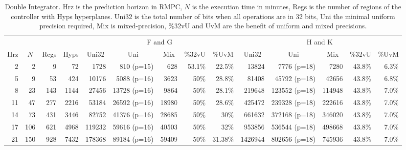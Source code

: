 \begin{table*}[p]
  \centering
  \caption{Double Integrator.\textmd{ Hrz is the prediction horizon in RMPC, $N$ is the execution time in minutes, Regs is the number of regions of the controller with Hyps hyperplanes. Uni32 is the total number of bits when all operations are in 32 bits, Uni the minimal uniform precision required, Mix is mixed-precision, \%32vU and UvM are the benefit of uniform and mixed precisions.}}
  \label{tab:di}
  \renewcommand{\arraystretch}{1.2}
  \setlength{\tabcolsep}{0.5em} %
  \begin{tabular}{rrrr|rrrrr|rrrrr}
    \toprule
    \multicolumn{4}{c}{} & \multicolumn{5}{|c|}{F and G} & \multicolumn{5}{c}{H and K} \\
    \multicolumn{1}{c}{Hrz}&
    \multicolumn{1}{c}{$N$}&
    \multicolumn{1}{c}{Regs} &
    \multicolumn{1}{c}{Hyps} &
    \multicolumn{1}{|c}{Uni32}&
    \multicolumn{1}{c}{Uni}&
    \multicolumn{1}{c}{Mix}&
    \multicolumn{1}{c}{\%32vU}&
    \multicolumn{1}{c}{\%UvM}&
    \multicolumn{1}{|c}{Uni32}&
    \multicolumn{1}{c}{Uni}&
    \multicolumn{1}{c}{Mix}&
    \multicolumn{1}{c}{\%32vU}&
    \multicolumn{1}{c}{\%UvM} \\
    \midrule
    2 & 2 & 9 & 72 & 1728 & 810 (p=15) & 628 & 53.1\% & 22.5\% & 13824 & 7776 (p=18) & 7280 & 43.8\%& 6.3\% \\
    5 & 9 & 53 & 424 & 10176 & 5088 (p=16) & 3623 & 50\% & 28.8\% & 81408 & 45792 (p=18) & 42656 & 43.8\% & 6.8\% \\
    8 & 23 & 143 & 1144 & 27456 & 13728 (p=16) & 9864 & 50\%  & 28.1\% & 219648 & 123552 (p=18) & 114948 & 43.8\% & 7.0\% \\
    11 & 47 & 277 & 2216 & 53184 & 26592 (p=16) & 18980 & 50\% & 28.6\% & 425472 & 239328 (p=18) & 222616 & 43.8\% & 7.0\% \\
    
    14 & 73 & 431& 3446& 82752& 41376 (p=16)& 28685& 50\% & 30\% & 661632& 372168 (p=18)& 346020& 43.8\% &7.0\% \\
    
    17 & 106 & 621 & 4968 & 119232 & 59616 (p=16) & 40503 & 50\% & 32\% & 953856& 536544 (p=18)& 498668& 43.8\% & 7.0\% \\
    
    21 & 150 & 928 & 7432 & 178368 & 89184 (p=16) & 59409 & 50\% & 31.38\% & 1426944 & 802656 (p=18) & 745936 & 43.8\% & 7.0\%  \\
    

\end{tabular}
\end{table*}
